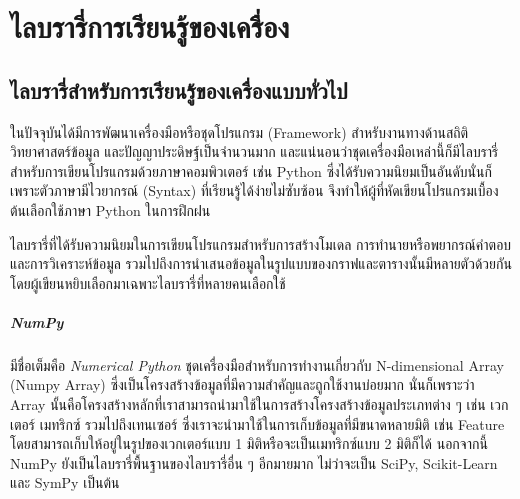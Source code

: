 

\chapter{ไลบรารี่การเรียนรู้ของเครื่อง}
\label{ch:library_ml}

\section{ไลบรารี่สำหรับการเรียนรู้ของเครื่องแบบทั่วไป}
\label{sec:lib_ml}

ในปัจจุบันได้มีการพัฒนาเครื่องมือหรือชุดโปรแกรม (Framework) สำหรับงานทางด้านสถิติ วิทยาศาสตร์ข้อมูล และปัญญาประดิษฐ์เป็นจำนวนมาก และแน่นอนว่าชุดเครื่องมือเหล่านี้ก็มีไลบรารี่สำหรับการเขียนโปรแกรมด้วยภาษาคอมพิวเตอร์ เช่น Python ซึ่งได้รับความนิยมเป็นอันดับนั่นก็เพราะตัวภาษามีไวยากรณ์ (Syntax) ที่เรียนรู้ได้ง่ายไม่ซับซ้อน จึงทำให้ผู้ที่หัดเขียนโปรแกรมเบื้องต้นเลือกใช้ภาษา Python ในการฝึกฝน

ไลบรารี่ที่ได้รับความนิยมในการเขียนโปรแกรมสำหรับการสร้างโมเดล การทำนายหรือพยากรณ์คำตอบ และการวิเคราะห์ข้อมูล รวมไปถึงการนำเสนอข้อมูลในรูปแบบของกราฟและตารางนั้นมีหลายตัวด้วยกัน โดยผู้เขียนหยิบเลือกมาเฉพาะไลบรารี่ที่หลายคนเลือกใช้
%
\paragraph{NumPy} มีชื่อเต็มคือ \textit{Numerical Python} ชุดเครื่องมือสำหรับการทำงานเกี่ยวกับ N-dimensional Array (Numpy Array) ซึ่งเป็นโครงสร้างข้อมูลที่มีความสำคัญและถูกใช้งานบ่อยมาก นั่นก็เพราะว่า Array นั้นคือโครงสร้างหลักที่เราสามารถนำมาใช้ในการสร้างโครงสร้างข้อมูลประเภทต่าง ๆ เช่น เวกเตอร์ เมทริกซ์ รวมไปถึงเทนเซอร์ ซึ่งเราจะนำมาใช้ในการเก็บข้อมูลที่มีขนาดหลายมิติ เช่น Feature โดยสามารถเก็บให้อยู่ในรูปของเวกเตอร์แบบ 1 มิติหรือจะเป็นเมทริกซ์แบบ 2 มิติก็ได้ นอกจากนี้ NumPy ยังเป็นไลบรารี่พื้นฐานของไลบรารี่อื่น ๆ อีกมายมาก ไม่ว่าจะเป็น SciPy, Scikit-Learn และ SymPy เป็นต้น

